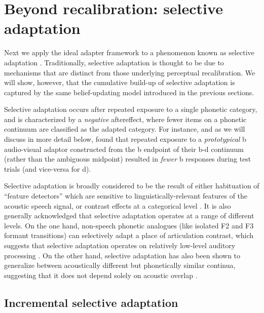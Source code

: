 \section{Beyond recalibration: selective adaptation}
\label{sec:selective-adapt}


Next we apply the ideal adapter framework to a phenomenon known as selective adaptation \autocite{Eimas1973,Samuel1986}.  Traditionally, selective adaptation is thought to be due to mechanisms that are distinct from those underlying perceptual recalibration.  We will show, however, that the cumulative build-up of selective adaptation is captured by the same belief-updating model introduced in the previous sections.

Selective adaptation occurs after repeated exposure to a single phonetic category, and is characterized by a \emph{negative} aftereffect, where fewer items on a phonetic continuum are classified as the adapted category.  For instance, and as we will discuss in more detail below, \textcite{Vroomen2007} found that repeated exposure to a \emph{prototypical} \ph b audio-visual adaptor constructed from the \ph b endpoint of their \ph b-\ph d continuum (rather than the ambiguous midpoint) resulted in \emph{fewer} \ph b responses during test trials (and vice-versa for \ph d).

Selective adaptation is broadly considered to be the result of either habituation of ``feature detectors'' which are sensitive to linguistically-relevant features of the acoustic speech signal, or contrast effects at a categorical level \autocite{Samuel1986}.  It is also generally acknowledged that selective adaptation operates at a range of different levels.  On the one hand, non-speech phonetic analogues (like isolated F2 and F3 formant transitions) can selectively adapt a place of articulation contrast, which suggests that selective adaptation operates on relatively low-level auditory processing \autocite{Samuel1996}. On the other hand, selective adaptation has also been shown to generalize between acoustically different but phonetically similar continua, suggesting that it does not depend solely on acoustic overlap \autocite{Samuel1996,Sawusch1977}.

\subsection{Incremental selective adaptation}
\label{sec:incr-select-adapt}

